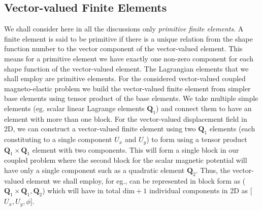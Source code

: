 \documentclass[11pt,a4paper,final]{article}
\begin{document}
\subsection{\textbf{Vector-valued Finite Elements}} We shall consider here in all the discussions only \textit{primitive finite elements}. A finite element is said to be primitive if there is a unique relation from the shape function number to the vector component of the vector-valued element. This means for a primitive element we have exactly one non-zero component for each shape function of the vector-valued element. The Lagrangian elements that we shall employ are primitive elements. For the considered vector-valued coupled magneto-elastic problem we build the vector-valued finite element from simpler base elements using tensor product of the base elements. We take multiple simple elements (eg. scalar linear Lagrange elements $\mathbf{Q}_1$) and connect them to have an element with more than one block. For the vector-valued displacement field in 2D, we can construct a vector-valued finite element using two $\mathbf{Q}_1$ elements (each constituting to a single component $U_x$ and $U_y$) to form using a tensor product $\mathbf{Q}_1 \times \mathbf{Q}_1$ element with two components. This will form a single block in our coupled problem where the second block for the scalar magnetic potential will have only a single component such as a quadratic element $\mathbf{Q}_2$. Thus, the vector-valued element we shall employ, for eg., can be represented in block form as ($\mathbf{Q}_1 \times \mathbf{Q}_1, \mathbf{Q}_2$) which will have in total $\text{dim}+1$ individual components in 2D as [$U_x, U_y, \phi$]. \newline 
\end{document}
